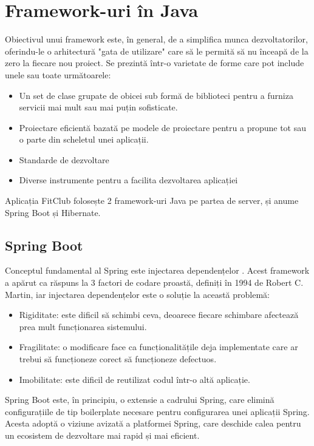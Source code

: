 \section{Framework-uri în Java}
Obiectivul unui framework \cite{.javaframework} este, în general, de a simplifica munca dezvoltatorilor, oferindu-le o arhitectură "gata de utilizare" care să le permită să nu înceapă de la zero la fiecare nou proiect. Se prezintă într-o varietate de forme care pot include unele sau toate următoarele:

\begin{itemize}
	\item{Un set de clase grupate de obicei sub formă de biblioteci pentru a furniza servicii mai mult sau mai puțin sofisticate.}
	\item{Proiectare eficientă bazată pe modele de proiectare pentru a propune tot sau o parte din scheletul unei aplicații.}
	\item{Standarde de dezvoltare}
	\item{Diverse instrumente pentru a facilita dezvoltarea aplicației}
	\newline
\end{itemize}

Aplicația FitClub folosește 2 framework-uri Java pe partea de server, și anume Spring Boot și Hibernate.\newline


\subsection{Spring Boot}
Conceptul fundamental al Spring este injectarea dependențelor \cite{.javaspringbook}.
Acest framework a apărut ca răspuns la 3 factori de codare proastă, definiți în 1994 de Robert C. Martin, iar injectarea dependențelor este o soluție la această problemă:

\begin{itemize}
	\item{Rigiditate: este dificil să schimbi ceva, deoarece fiecare schimbare afectează prea mult funcționarea sistemului.}
	\item{Fragilitate: o modificare face ca funcționalitățile deja implementate care ar trebui să funcționeze corect să funcționeze defectuos.}
	\item{Imobilitate: este dificil de reutilizat codul într-o altă aplicație.}
	\newline
\end{itemize}

Spring Boot este, în principiu, o extensie a cadrului Spring, care elimină configurațiile de tip boilerplate necesare pentru configurarea unei aplicații Spring. Acesta adoptă o viziune avizată a platformei Spring, care deschide calea pentru un ecosistem de dezvoltare mai rapid și mai eficient.\newline

